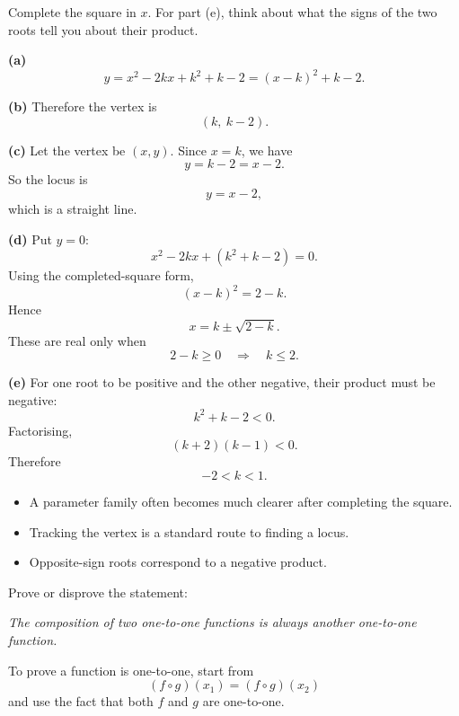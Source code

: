 \begin{hint}
Complete the square in $x$. For part (e), think about what the signs of the two roots tell you about their product.
\end{hint}

\begin{solution}
\textbf{(a)}
\[
y=x^2-2kx+k^2+k-2=(x-k)^2+k-2.
\]

\textbf{(b)} Therefore the vertex is
\[
\boxed{(k,\ k-2).}
\]

\textbf{(c)} Let the vertex be $(x,y)$. Since $x=k$, we have
\[
y=k-2=x-2.
\]
So the locus is
\[
\boxed{y=x-2,}
\]
which is a straight line.

\textbf{(d)} Put $y=0$:
\[
x^2-2kx+(k^2+k-2)=0.
\]
Using the completed-square form,
\[
(x-k)^2=2-k.
\]
Hence
\[
x=k\pm \sqrt{2-k}.
\]
These are real only when
\[
2-k\ge 0
\quad\Longrightarrow\quad
\boxed{k\le 2.}
\]

\textbf{(e)} For one root to be positive and the other negative, their product must be negative:
\[
k^2+k-2<0.
\]
Factorising,
\[
(k+2)(k-1)<0.
\]
Therefore
\[
\boxed{-2<k<1.}
\]
\end{solution}

\begin{takeaways}
\begin{itemize}[leftmargin=*]
\item A parameter family often becomes much clearer after completing the square.
\item Tracking the vertex is a standard route to finding a locus.
\item Opposite-sign roots correspond to a negative product.
\end{itemize}
\end{takeaways}

\begin{problem}
Prove or disprove the statement:

\begin{center}
\emph{The composition of two one-to-one functions is always another one-to-one function.}
\end{center}
\end{problem}

\begin{hint}
To prove a function is one-to-one, start from
\[
(f\circ g)(x_1)=(f\circ g)(x_2)
\]
and use the fact that both $f$ and $g$ are one-to-one.
\end{hint}

